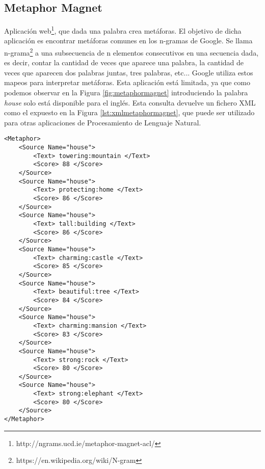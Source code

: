 \subsection{Metaphor Magnet}
\label{cap:subsec:metaphormagnet}
Aplicación web\footnote{http://ngrams.ucd.ie/metaphor-magnet-acl/}, que dada una palabra crea metáforas. El objetivo \citep{VealeT2012} de dicha aplicación es encontrar metáforas comunes en los n-gramas de Google. Se llama n-grama\footnote{https://en.wikipedia.org/wiki/N-gram} a una subsecuencia de n elementos consecutivos en una secuencia dada, es decir, contar la cantidad de veces que aparece una palabra, la cantidad de veces que aparecen dos palabras juntas, tres palabras, etc... Google utiliza estos mapeos para interpretar metáforas. Esta aplicación está limitada, ya que como podemos observar en la Figura \ref{fig:metaphormagnet} introduciendo la palabra \textit{house} solo está disponible para el inglés.
Esta consulta devuelve un fichero XML como el expuesto en la Figura \ref{lst:xmlmetaphormagnet}, que puede ser utilizado para otras aplicaciones de Procesamiento de Lenguaje Natural.
\lstset{language=XML}
\begin{lstlisting}[caption= Ejemplo formatos XML Metaphor Magnet, label={lst:xmlmetaphormagnet}, frame=single]
<Metaphor>
	<Source Name="house">
		<Text> towering:mountain </Text>
		<Score> 88 </Score>
	</Source>
	<Source Name="house">
		<Text> protecting:home </Text>
		<Score> 86 </Score>
	</Source>
	<Source Name="house">
		<Text> tall:building </Text>
		<Score> 86 </Score>
	</Source>
	<Source Name="house">
		<Text> charming:castle </Text>
		<Score> 85 </Score>
	</Source>
	<Source Name="house">
		<Text> beautiful:tree </Text>
		<Score> 84 </Score>
	</Source>
	<Source Name="house">
		<Text> charming:mansion </Text>
		<Score> 83 </Score>
	</Source>
	<Source Name="house">
		<Text> strong:rock </Text>
		<Score> 80 </Score>
	</Source>
	<Source Name="house">
		<Text> strong:elephant </Text>
		<Score> 80 </Score>
	</Source>
</Metaphor>
\end{lstlisting}



